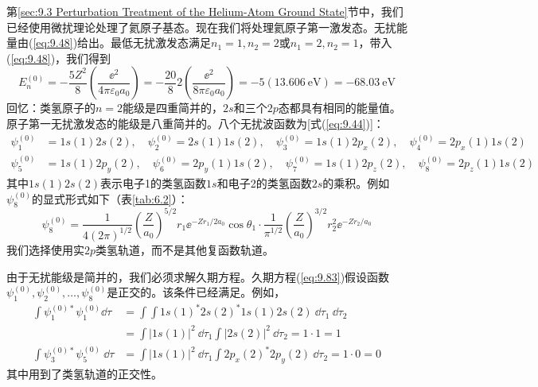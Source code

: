     第\ref{sec:9.3 Perturbation Treatment of the Helium-Atom Ground State}节中，我们已经使用微扰理论处理了氦原子基态。现在我们将处理氦原子第一激发态。无扰能量由(\ref{eq:9.48})给出。最低无扰激发态满足$n_1 = 1, n_2 = 2$或$n_1 = 2, n_2 = 1$，带入(\ref{eq:9.48})，我们得到
    \begin{equation}
        E_n^{\left(0\right)} = -\frac{5Z^2}{8}\left(\frac{\ee ^2}{4\pi\varepsilon_0a_0}\right) = -\frac{20}{8}2\left(\frac{\ee ^2}{8\pi\varepsilon_0a_0}\right) = -5\left(13.606 \:\mathrm{eV}\right) = -68.03 \:\mathrm{eV}
        \label{eq:9.92}
    \end{equation}
    回忆：类氢原子的$n=2$能级是四重简并的，$2s$和三个$2p$态都具有相同的能量值。原子第一无扰激发态的能级是八重简并的。八个无扰波函数为[式(\ref{eq:9.44})]：
    \begin{equation}
        \begin{aligned}
            \psi_1^{\left(0\right)} &= 1s\left(1\right)2s\left(2\right), \quad \psi_2^{\left(0\right)} = 2s\left(1\right)1s\left(2\right), \quad \psi_3^{\left(0\right)} = 1s\left(1\right)2p_x\left(2\right), \quad \psi_4^{\left(0\right)} = 2p_x\left(1\right)1s\left(2\right) \\
            \psi_5^{\left(0\right)} &= 1s\left(1\right)2p_y\left(2\right), \quad \psi_6^{\left(0\right)} = 2p_y\left(1\right)1s\left(2\right), \quad \psi_7^{\left(0\right)} = 1s\left(1\right)2p_z\left(2\right), \quad \psi_8^{\left(0\right)} = 2p_z\left(1\right)1s\left(2\right)
        \end{aligned}
        \label{eq:9.93}
    \end{equation}
    其中$1s\left(1\right)2s\left(2\right)$表示电子1的类氢函数$1s$和电子2的类氢函数$2s$的乘积。例如$\psi_8^{\left(0\right)}$的显式形式如下（表\ref{tab:6.2}）：
    \begin{equation*}
        \psi_8^{\left(0\right)} = \frac{1}{4\left(2\pi\right)^{1/2}}\left(\frac{Z}{a_0}\right)^{5/2}r_1\ee ^{-Zr_1/2a_0}\cos\theta_1 \cdot \frac{1}{\pi^{1/2}}\left(\frac{Z}{a_0}\right)^{3/2}r_2^2\ee ^{-Zr_2/a_0}
    \end{equation*}
    我们选择使用实$2p$类氢轨道，而不是其他复函数轨道。

    由于无扰能级是简并的，我们必须求解久期方程。久期方程(\ref{eq:9.83})假设函数$\psi_1^{\left(0\right)}, \psi_2^{\left(0\right)}, \ldots, \psi_8^{\left(0\right)}$是正交的。该条件已经满足。例如，
    \begin{equation*}
        \begin{aligned}
            \int \psi_1^{\left(0\right)*}\psi_1^{\left(0\right)}\dd \tau &= \int\int 1s\left(1\right)^*2s\left(2\right)^*1s\left(1\right)2s\left(2\right)\:\dd \tau_1\:\dd \tau_2 \\
            &= \int \left|1s\left(1\right)\right|^2 \:\dd \tau_1 \int \left|2s\left(2\right)\right|^2 \:\dd \tau_2 = 1 \cdot 1 = 1 \\ 
            \int \psi_3^{\left(0\right)*}\psi_5^{\left(0\right)}\:\dd \tau &= \int \left|1s\left(1\right)\right|^2 \:\dd \tau_1 \int 2p_x\left(2\right)^*2p_y\left(2\right)\:\dd \tau_2 = 1 \cdot 0 = 0
        \end{aligned}
    \end{equation*}
    其中用到了类氢轨道的正交性。

